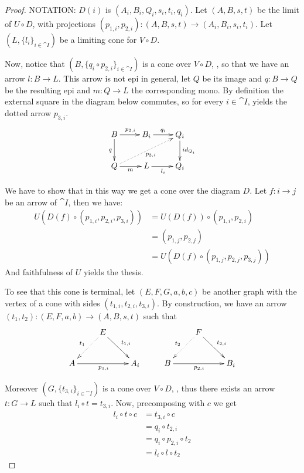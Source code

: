 \begin{proof} 
	NOTATION: $D(i)$ is $(A_i, B_i, Q_i, s_i, t_i, q_i)$.	Let $(A, B, s, t)$ be the limit of $U\circ D$, with projections $(p_{1,i}, p_{2,i})\colon (A,B, s,t)\to (A_i, B_i, s_i, t_i)$. Let $(L, \{l_i\}_{i\in \cat{I}})$ be a limiting cone for $V\circ D$. 
	
	Now, notice that $(B, \{q_i\circ p_{2,i}\}_{i\in \cat{I}})$ is a cone over $V\circ D$, , so that we have an arrow $l\colon B\to L$. This arrow is not epi in general, let $Q$ be its image and $q\colon B\to Q$ be the resulting epi and $m\colon Q\to L$ the corresponding mono.
	By definition the external square in the diagram below commutes, so for every $i\in \cat{I}$,  yields the dotted arrow $p_{3,i}$.
	\[\xymatrix{B \ar[r]^{p_{2,i}} \ar[d]_{q}& B_i \ar[r]^{q_i} & Q_i \ar[d]^{id_{Q_i}}\\ Q \ar[r]_{m} \ar@{.>}[urr]_{p_{3,i}}& L \ar[r]_{l_i} & Q_i}\]
	
	We have to show that in this way we get a cone over the diagram $D$. Let $f\colon i\to j$ be an arrow of $\cat{I}$, then we have:
	\begin{align*}
	U(D(f)\circ (p_{1,i}, p_{2, i}, p_{3,i}))&=U(D(f))\circ(p_{1,i}, p_{2, i})\\&=(p_{1,j}, p_{2, j})\\&= U(D(f)\circ (p_{1,j}, p_{2, j}, p_{3,j}))
	\end{align*}
	 And faithfulness of $U$ yields the thesis.
	 
	 To see that this cone is terminal, let $(E, F, G, a, b, c)$ be another graph with the vertex of a cone with sides $(t_{1,i},t_{2, i}, t_{3,i})$. By construction, we have an arrow $(t_1, t_2)\colon (E, F, a, b)\to (A, B, s, t)$ such that
	 \[\xymatrix{&E \ar@{.>}[dl]_{t_1} \ar[dr]^{t_{1,i}}&&&F \ar@{.>}[dl]_{t_2} \ar[dr]^{t_{2,i}}\\ A \ar[rr]_{p_{1,i}} & & A_i & B \ar[rr]_{p_{2,i}}&& B_i }\]
	
	Moreover $(G, \{t_{3,i}\}_{i\in \cat{I}})$ is a cone over $V\circ D$, , thus there exists an arrow $t\colon G\to L$ such that $l_i\circ t =t_{3,i}$. Now, precomposing with $c$ we get
	\begin{align*}
		l_i\circ t\circ c&=t_{3,i}\circ c\\&=q_i\circ t_{2,i}\\&=q_i\circ p_{2,i}\circ t_2\\&=l_i\circ l\circ t_2
	\end{align*} 
	

\end{proof}
